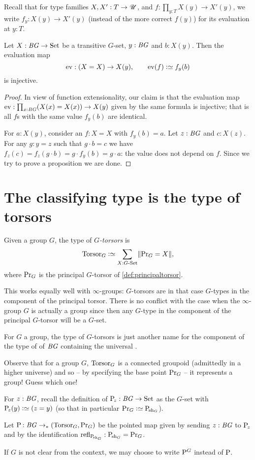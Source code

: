 Recall that for type families $X,X':T\to{\mathscr{U}}$, and
$f:\prod_{y:T}X(y)\to X'(y)$, we write $f_y:X(y)\to X'(y)$ (instead of
the more correct $f(y)$) for its evaluation at $y:T$.
\begin{lemma}
  \label{lem:evisinjwhentransitive}
  Let $X:\mathit{B}\mathit{G}\to\mathrm{Set}$ be a transitive $G$-set, $y:\mathit{B}\mathit{G}$ and $b:X(y)$.  Then the evaluation map
$$\mathrm{ev}:(X=X)\to X(y),\qquad \mathrm{ev}(f)\defequi f_y(b)$$
is injective.
\end{lemma}
\begin{proof}
  In view of function extensionality, our claim is that the evaluation
  map $\ev:\prod_{x:\BG}(X(x)=X(x))\to X(y)$ given by the same formula
  is injective; that is all $f$s with the same value $f_y(b)$ are
  identical.

  For $a:X(y)$, consider an $f:X=X$ with $f_y(b)=a$.  Let $z:\mathit{B}\mathit{G}$ and
  $c:X(z)$.  For any $g:y=z$ such that $g\cdot b=c$ we have
  $f_z(c)=f_z(g\cdot b)=g \cdot f_y(b)=g \cdot a$: the value does not
  depend on $f$. Since we try to prove a proposition we are done.
\end{proof}



\section{The classifying type is the type of torsors}
\label{sec:torsors}
\begin{definition}
  Given a group  $G$, the type of {\em$G$-torsors} is
$$\typetorsor_G\defequi\sum_{X:\GSet}\Trunc{\princ G=X},$$
where $\mathrm{Pr}_{{G}}$ is the principal $G$-torsor of \cref{def:principaltorsor}.
\end{definition}
\begin{remark}
  This works equally well with $\infty$-groups: $G$-torsors are in that case $G$-types in the component of the principal torsor.  There is no conflict with the case when the $\infty$-group $G$ is actually a group since then any $G$-type in the component of the principal $G$-torsor will be a $G$-set.
\end{remark}

\begin{remark}
  For $G$ a group, the type of $G$-torsors is just another name for the component of the type of \coverings of $\mathit{B}\mathit{G}$ containing the universal \covering.

Observe that for a group $G$, $\mathrm{Torsor}_G$ is a connected groupoid (admittedly in a higher universe) and so -- by specifying the base point $\mathrm{Pr}_{{G}}$ -- it represents a group!  Guess which one!
\end{remark}
\begin{remark}
  \label{def:BG2TorsG}
  For $z:\mathit{B}\mathit{G}$, recall the definition of $\mathrm{P}_{\!z}:\mathit{B}\mathit{G}\to\mathrm{Set}$ as the
  $G$-set with $\pathsp z(y)\defequi(z=y)$ (so that in particular
  $\princ G\defequi\pathsp{\sh_G}$).

  Let $\mathrm{P}_{\!}:\mathit{B}\mathit{G}\to_*(\mathrm{Torsor}_G,\mathrm{Pr}_{{G}})$ be the pointed map given by sending $z:\mathit{B}\mathit{G}$ to $\mathrm{P}_{\!z}$ and by the identification $\refl{\pathsp{\sh_G}}:\pathsp{\sh_G}=\princ G$. 
\end{remark}
If $G$ is not clear from the context, we may choose to write $\mathrm{P}_{\!}^G$ instead of $\mathrm{P}_{\!}$.


